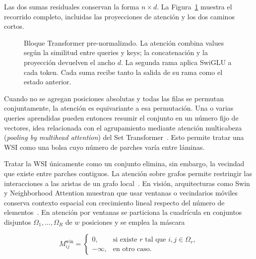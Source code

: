 Las dos sumas residuales conservan la forma \(n\times d\). La
Figura~\ref{fig:bloque-transformer} muestra el recorrido completo, incluidas las
proyecciones de atención y los dos caminos cortos.

\begin{figure}[htbp]
    \centering
    \begingroup{}
    \resizebox{\textwidth}{!}{}
    \endgroup
    \caption{Bloque Transformer pre-normalizado. La atención combina values
    según la similitud entre queries y keys; la concatenación y la proyección
    devuelven el ancho \(d\). La segunda rama aplica SwiGLU a cada token. Cada
    suma recibe tanto la salida de su rama como el estado anterior.}
    \label{fig:bloque-transformer}
\end{figure}
\FloatBarrier

\begingroup{}
Cuando no se
agregan posiciones absolutas y todas las filas se permutan conjuntamente, la
atención es equivariante a esa permutación. Una o varias queries aprendidas
pueden entonces resumir el conjunto en un número fijo de vectores, idea
relacionada con el agrupamiento mediante atención multicabeza (\emph{pooling by multihead attention}) del Set
Transformer~\cite{lee_settransformer_2019}. Esto permite tratar una WSI como
una bolsa cuyo número de parches varía entre láminas.
\par\endgroup

Tratar la WSI únicamente como un conjunto elimina, sin embargo, la vecindad que
existe entre parches contiguos. La atención sobre grafos permite restringir las
interacciones a las aristas de un grafo local~\cite{velickovic_graph_2018}. En
visión, arquitecturas como Swin y Neighborhood Attention muestran que usar
ventanas o vecindarios móviles conserva contexto espacial con crecimiento
lineal respecto del número de elementos~\cite{liu_swin_2021,hassani_neighborhood_2023}.
En atención por ventanas se particiona la cuadrícula en conjuntos disjuntos
\(\Omega_1,\ldots,\Omega_R\) de \(w\) posiciones y se emplea la máscara

\begin{equation}
    M^{\mathrm{win}}_{ij}=
    \begin{cases}
       0, & \text{si existe }r\text{ tal que }i,j\in\Omega_r,\\
       -\infty, & \text{en otro caso}.
    \end{cases}
    \label{eq:mascara-window-attention}
\end{equation}

